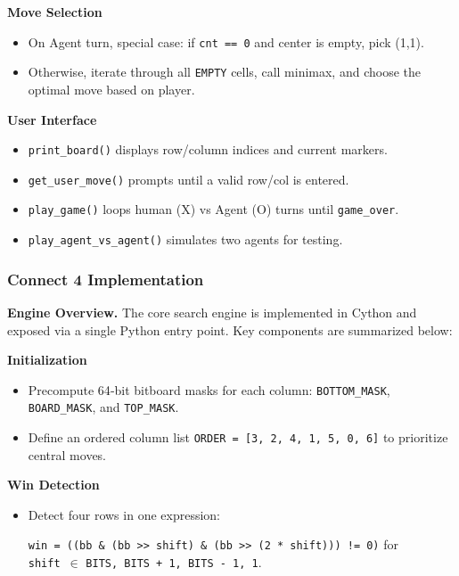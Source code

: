 \documentclass[12pt]{article}
\begin{document}
\noindent\textbf{Move Selection}
\begin{itemize}
  \item On Agent turn, special case: if \texttt{cnt == 0} and center is empty, pick (1,1).  
  \item Otherwise, iterate through all \texttt{EMPTY} cells, call minimax, and choose the optimal move based on player.
\end{itemize}

\noindent\textbf{User Interface}
\begin{itemize}
  \item \texttt{print\_board()} displays row/column indices and current markers.  
  \item \texttt{get\_user\_move()} prompts until a valid row/col is entered.  
  \item \texttt{play\_game()} loops human (X) vs Agent (O) turns until \texttt{game\_over}.  
  \item \texttt{play\_agent\_vs\_agent()} simulates two agents for testing.
\end{itemize}

\subsubsection{Connect 4 Implementation}

\textbf{Engine Overview.}  
The core search engine is implemented in Cython and exposed via a single Python entry point. Key components are summarized below:

\vspace{1em}

\noindent\textbf{Initialization}
\begin{itemize}
  \item Precompute 64‑bit bitboard masks for each column: \texttt{BOTTOM\_MASK}, \texttt{BOARD\_MASK}, and \texttt{TOP\_MASK}.
  \item Define an ordered column list \texttt{ORDER = [3, 2, 4, 1, 5, 0, 6]} to prioritize central moves.
\end{itemize}

\noindent\textbf{Win Detection}
\begin{itemize}
  \item Detect four rows in one expression:
  \begin{center}
  \texttt{win = ((bb \& (bb >> shift) \& (bb >> (2 * shift))) != 0)} for \\ \texttt{shift} \,$\in$ {\texttt{BITS, BITS + 1, BITS - 1, 1}}.
  \end{center}
\end{itemize}
\end{document}
